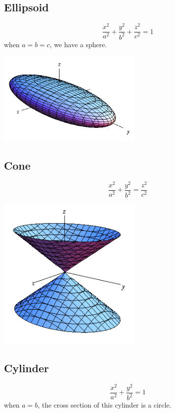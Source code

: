 \documentclass{article}
\begin{document}
\subsection*{Ellipsoid}
\[ \frac{x^2}{a^2} + \frac{y^2}{b^2} + \frac{z^2}{c^2} = 1 \]
when $a = b = c$, we have a sphere. 
\begin{center}
	\includegraphics*[width=7cm]{ellipsoid.png}
\end{center}

	
\subsection*{Cone}
\[ \frac{x^2}{a^2} + \frac{y^2}{b^2} = \frac{z^2}{c^2} \]
\begin{center}
	\includegraphics*[width=7cm]{cone.png}
\end{center}

\subsection*{Cylinder}
\[ \frac{x^2}{a^2} + \frac{y^2}{b^2} = 1 \]
when $a=b$, the cross section of this cylinder is a circle.
\end{document}
